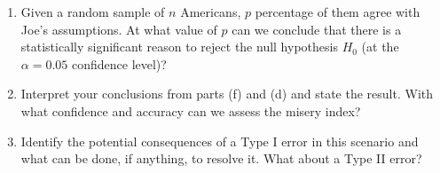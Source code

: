 \begin{enumerate}[itemsep=0.5cm]
\begin{adjustwidth}{0.3in}{0.3in}
\begin{enumerate}[itemsep=0.5cm]
            \item Given a random sample of $n$ Americans, $p$ percentage
                  of them agree with Joe's assumptions. At what value of
                  $p$ can we conclude that there is a statistically
                  significant reason to reject the null hypothesis $H_0$
                  (at the $\alpha = 0.05$ confidence level)?

            \item Interpret your conclusions from parts (f) and (d) and
                  state the result. With what confidence and accuracy can we
                  assess the misery index?

            \item Identify the potential consequences of a Type I error
                  in this scenario and what can be done, if anything, to
                  resolve it. What about a Type II error?
          \end{enumerate}
        \end{adjustwidth}
\end{enumerate}